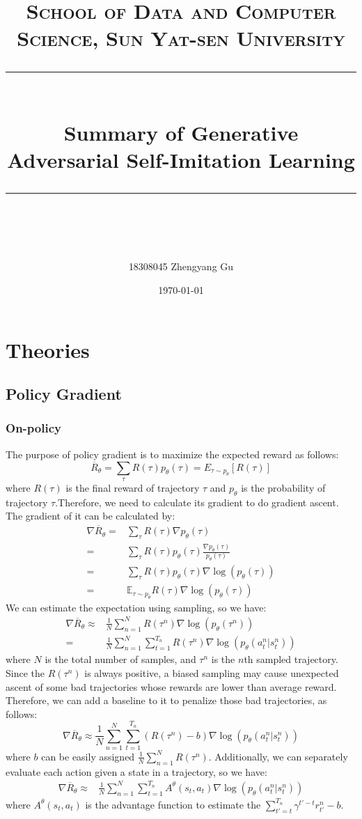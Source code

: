 \documentclass[UTF8, a4paper, 11pt]{article}
\title{	
\normalfont \normalsize
\textsc{School of Data and Computer Science, Sun Yat-sen University} \\ [25pt] %
\rule{\textwidth}{0.5pt} \\[0.4cm] %
\huge Summary of Generative Adversarial Self-Imitation Learning\\ %
\rule{\textwidth}{2pt} \\[0.5cm] %
\author{18308045 Zhengyang Gu}
\date{\normalsize\today}
}
\begin{document}
\maketitle
\tableofcontents
\newpage

\section{Theories}
\subsection{Policy Gradient}
\subsubsection{On-policy}
The purpose of policy gradient is to maximize the expected reward as follows:
$$\overline R_\theta=\sum_\tau R(\tau)p_\theta(\tau)=E_{\tau\sim p_\theta}[R(\tau)]$$
where $R(\tau)$ is the final reward of trajectory $\tau$ and $p_\theta$ is the probability of trajectory $\tau$.Therefore, we need to calculate its gradient to do
gradient ascent. The gradient of it can be calculated by:
$$\begin{aligned}
\nabla\overline R_\theta=&\sum_\tau R(\tau)\nabla p_\theta(\tau)\\
=&\sum_\tau R(\tau)p_\theta(\tau)\frac{\nabla p_\theta(\tau)}{p_\theta(\tau)}\\
=&\sum_\tau R(\tau)p_\theta(\tau)\nabla\log(p_\theta(\tau))\\
=&\mathbb{E}_{\tau\sim p_\theta} R(\tau)\nabla\log(p_\theta(\tau))
\end{aligned}$$
We can estimate the expectation using sampling, so we have:
$$\begin{aligned}
\nabla\overline R_\theta\approx&\frac1 N\sum_{n=1}^N R(\tau^n)\nabla\log(p_\theta(\tau^n))\\
=&\frac1 N\sum_{n=1}^N\sum_{t=1}^{T_n}R(\tau^n)\nabla\log(p_\theta(a_t^n|s_t^n))
\end{aligned}$$
where $N$ is the total number of samples, and $\tau^n$ is the $n$th sampled trajectory. Since the $R(\tau^n)$ is always positive, a biased sampling may cause
unexpected ascent of some bad trajectories whose rewards are lower than average reward. Therefore, we can add a baseline to it to penalize those bad trajectories,
as follows:
$$\nabla\overline R_\theta\approx\frac1 N\sum_{n=1}^N\sum_{t=1}^{T_n}(R(\tau^n)-b)\nabla\log(p_\theta(a_t^n|s_t^n))$$
where $b$ can be easily assigned $\frac1 N\sum_{n=1}^N R(\tau^n)$. Additionally, we can separately evaluate each action given a state in a trajectory, so we have:
$$\begin{aligned}
\nabla\overline R_\theta\approx&\frac1 N\sum_{n=1}^N\sum_{t=1}^{T_n}A^\theta(s_t,a_t)\nabla\log(p_\theta(a_t^n|s_t^n))
\end{aligned}$$
where $A^\theta(s_t,a_t)$ is the advantage function to estimate the $\sum_{t'=t}^{T_n}\gamma^{t'-t}r_{t'}^n-b$.
\end{document}
